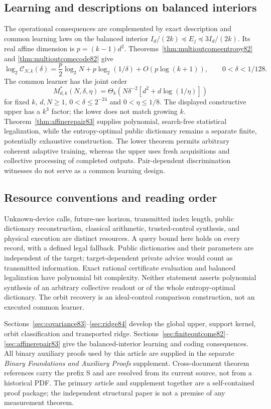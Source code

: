\subsection{Learning and descriptions on balanced interiors}
The operational consequences are complemented by exact description
and common learning laws on the balanced interior
$I_d/(2k)\preceq E_j\preceq3I_d/(2k)$.  Its real affine dimension
is $p=(k-1)d^2$.  Theorems~\ref{thm:multioutcomeentropy82} and
\ref{thm:multioutcomecode82} give
\[
 \log_2\mathcal C_{N,k}(\delta)
 =\frac p2\log_2N+p\log_2(1/\delta)+O(p\log(k+1)),
 \qquad 0<\delta<1/128.
\]
The common learner has the joint order
\[
 M^*_{d,k}(N,\delta,\eta)
 =\Theta_k\!\left(N\delta^{-2}[d^2+d\log(1/\eta)]\right)
\]
for fixed $k$, $d,N\ge1$, $0<\delta\le2^{-24}$ and
$0<\eta\le1/8$.  The displayed constructive upper has a $k^3$
factor; the lower does not match growing $k$.
Theorem~\ref{thm:affinerepair83} supplies polynomial, search-free
statistical legalization, while the entropy-optimal public dictionary
remains a separate finite, potentially exhaustive construction.
The lower theorem permits arbitrary coherent adaptive training,
whereas the upper uses fresh acquisitions and collective processing
of completed outputs.  Pair-dependent discrimination witnesses do
not serve as a common learning design.

\subsection{Resource conventions and reading order}
Unknown-device calls, future-use horizon, transmitted index length,
public dictionary reconstruction, classical arithmetic, trusted-control
synthesis, and physical execution are distinct resources.  A query
bound here holds on every record, with a defined legal fallback.
Public dictionaries and their parameters are independent of the
target; target-dependent private advice would count as transmitted
information.  Exact rational certificate evaluation and balanced
legalization have polynomial bit complexity.  Neither statement
asserts polynomial synthesis of an arbitrary collective readout or
of the whole entropy-optimal dictionary.  The orbit recovery is an
ideal-control comparison construction, not an executed common learner.

Sections~\ref{sec:covariance83}--\ref{sec:ridge84} develop the global
upper, support kernel, orbit classification and transported ridge.
Sections~\ref{sec:finiteoutcome82}--\ref{sec:affinerepair83} give the
balanced-interior learning and coding consequences.
All binary auxiliary proofs used by this article are supplied in the
separate \emph{Binary Foundations and Auxiliary Proofs} supplement.
Cross-document theorem references carry the prefix S and are resolved
from its current source, not from a historical PDF.  The primary article
and supplement together are a self-contained proof package; the
independent structural paper is not a premise of any measurement theorem.

